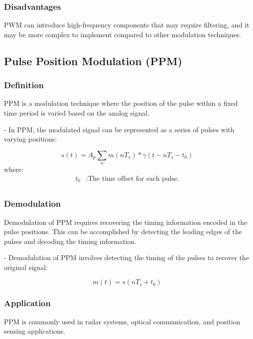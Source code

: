 \documentclass{IEEEtran}
\begin{document}
	\subsubsection{Disadvantages}
	PWM can introduce high-frequency components that may require filtering, and it may be more complex to implement compared to other modulation techniques.
	
	\subsection{ Pulse Position Modulation (PPM)}
	
	\subsubsection{Definition}
	PPM is a modulation technique where the position of the pulse within a fixed time period is varied based on the analog signal.
	
	- In PPM, the modulated signal can be represented as a series of pulses with varying positions:

	\begin{equation}
		s(t) = A_p \sum_n m(nT_s) * \gamma (t - nT_s - t_0)
	\end{equation}
	where: \\
	\begin{align*}
		t_0  & : \text{The time offset for each pulse.} \\
	\end{align*}
	
	\subsubsection{Demodulation}
	Demodulation of PPM requires recovering the timing information encoded in the pulse positions. This can be accomplished by detecting the leading edges of the pulses and decoding the timing information.
	
	- Demodulation of PPM involves detecting the timing of the pulses to recover the original signal:
	
	\begin{equation}
		m(t) = s(nT_s + t_0)
	\end{equation}
	
	\subsubsection{Application}
	PPM is commonly used in radar systems, optical communication, and position sensing applications.
	
\end{document}
